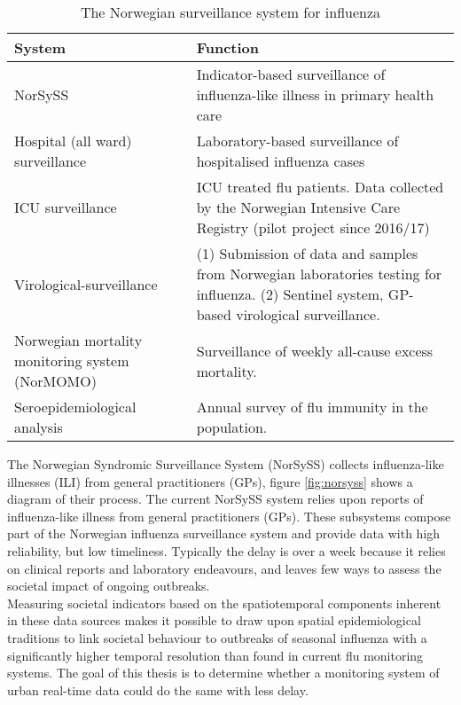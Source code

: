 \begin{table}[!htb]
\begin{tabular}{ | m{9em} | m{10cm}| }
 \hline
 \textbf{System} & \textbf{Function} \\ [0.5ex] 
 \hline
 NorSySS & Indicator-based surveillance of influenza-like illness in primary health care \\ 
  \hline
 Hospital (all ward) surveillance  & Laboratory-based surveillance of hospitalised influenza cases \\[1ex]
  \hline
 ICU surveillance & ICU treated flu patients. Data collected by the Norwegian Intensive Care Registry (pilot project since 2016/17) \\
  \hline
 Virological-surveillance & (1) Submission of data and samples from Norwegian laboratories testing for influenza.
(2) Sentinel system, GP-based virological surveillance. \\[1ex]
  \hline
 Norwegian mortality monitoring system (NorMOMO) & Surveillance of weekly all-cause excess mortality. \\[1ex]
 \hline
 Seroepidemiological analysis & Annual survey of flu immunity in the population. \\ [1ex] 
 \hline
\end{tabular}
\caption{The Norwegian surveillance system for influenza}
 \label{table:1}
\end{table}

The Norwegian Syndromic Surveillance System (NorSySS) collects influenza-like illnesses (ILI) from general practitioners (GPs)\cite{NorSySS}, figure \ref{fig:norsyss} shows a diagram of their process. The current NorSySS system relies upon reports of influenza-like illness from general practitioners (GPs).  These subsystems compose part of the Norwegian influenza surveillance system and provide data with high reliability, but low timeliness. Typically the delay is over a week because it relies on clinical reports and laboratory endeavours, and leaves few ways to assess the societal impact of ongoing outbreaks.\\ Measuring societal indicators based on the spatiotemporal components inherent in these data sources makes it possible to draw upon spatial epidemiological traditions to link societal behaviour to outbreaks of seasonal influenza with a significantly higher temporal resolution than found in current flu monitoring systems. The goal of this thesis is to determine whether a monitoring system of urban real-time data could do the same with less delay.

